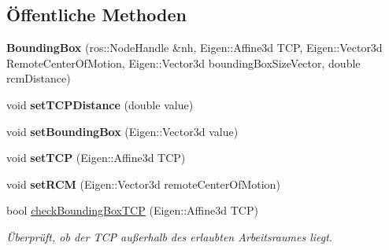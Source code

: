 \subsection*{Öffentliche Methoden}
\begin{DoxyCompactItemize}
\item 
\hypertarget{classBoundingBox_a9cca955ede84d4eacb28867bab60515a}{{\bfseries Bounding\-Box} (ros\-::\-Node\-Handle \&nh, Eigen\-::\-Affine3d T\-C\-P, Eigen\-::\-Vector3d Remote\-Center\-Of\-Motion, Eigen\-::\-Vector3d bounding\-Box\-Size\-Vector, double rcm\-Distance)}\label{classBoundingBox_a9cca955ede84d4eacb28867bab60515a}

\item 
\hypertarget{classBoundingBox_a77311a3a943fc60baafcdb2736b72dd1}{void {\bfseries set\-T\-C\-P\-Distance} (double value)}\label{classBoundingBox_a77311a3a943fc60baafcdb2736b72dd1}

\item 
\hypertarget{classBoundingBox_a8876f5598dd64840cecb62876880a672}{void {\bfseries set\-Bounding\-Box} (Eigen\-::\-Vector3d value)}\label{classBoundingBox_a8876f5598dd64840cecb62876880a672}

\item 
\hypertarget{classBoundingBox_a90fa5d3bf50542bec97dff5a8cc5ea96}{void {\bfseries set\-T\-C\-P} (Eigen\-::\-Affine3d T\-C\-P)}\label{classBoundingBox_a90fa5d3bf50542bec97dff5a8cc5ea96}

\item 
\hypertarget{classBoundingBox_ace45e8101d411b6afe423ad2f919b733}{void {\bfseries set\-R\-C\-M} (Eigen\-::\-Vector3d remote\-Center\-Of\-Motion)}\label{classBoundingBox_ace45e8101d411b6afe423ad2f919b733}

\item 
bool \hyperlink{classBoundingBox_ad5ea0824f81b82172ac870b344e26369}{check\-Bounding\-Box\-T\-C\-P} (Eigen\-::\-Affine3d T\-C\-P)
\begin{DoxyCompactList}\small\item\em Überprüft, ob der T\-C\-P außerhalb des erlaubten Arbeitsraumes liegt. \end{DoxyCompactList}\end{DoxyCompactItemize}

